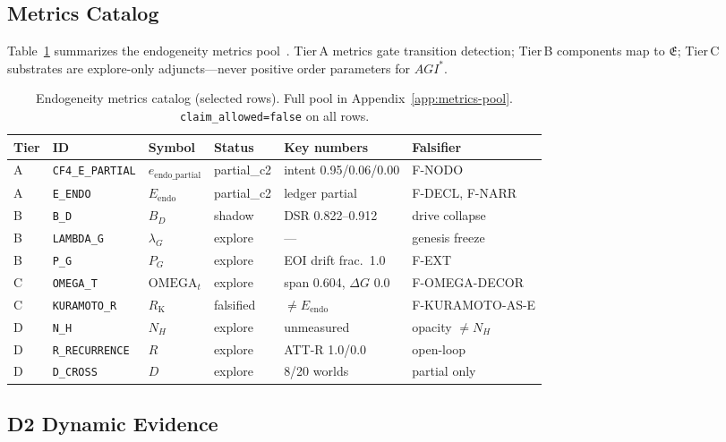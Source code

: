 \documentclass[11pt,a4paper]{article}
\theoremstyle{definition}
\begin{document}
\subsection{Metrics Catalog}\label{sec:metrics-catalog}

Table~\ref{tab:metrics-catalog} summarizes the endogeneity metrics pool~\cite{kuznetsov2026metrics}. Tier\,A metrics gate transition detection; Tier\,B components map to $\mathfrak{E}$; Tier\,C substrates are explore-only adjuncts---never positive order parameters for $AGI^{*}$.

\begin{table}[H]
\centering\scriptsize
\begin{tabular}{llllp{2.8cm}l}
\toprule Tier & ID & Symbol & Status & Key numbers & Falsifier \\ \midrule
A & \texttt{CF4\_E\_PARTIAL} & $e_{\mathrm{endo\_partial}}$ & partial\_c2 & intent 0.95/0.06/0.00 & F-NODO \\
A & \texttt{E\_ENDO} & $E_{\mathrm{endo}}$ & partial\_c2 & ledger partial & F-DECL, F-NARR \\
B & \texttt{B\_D} & $B_D$ & shadow & DSR 0.822--0.912 & drive collapse \\
B & \texttt{LAMBDA\_G} & $\lambda_G$ & explore & --- & genesis freeze \\
B & \texttt{P\_G} & $P_G$ & explore & EOI drift frac.\ 1.0 & F-EXT \\
C & \texttt{OMEGA\_T} & $\mathrm{OMEGA}_t$ & explore & span 0.604, $\Delta G$ 0.0 & F-OMEGA-DECOR \\
C & \texttt{KURAMOTO\_R} & $R_{\mathrm{K}}$ & falsified & $\neq E_{\mathrm{endo}}$ & F-KURAMOTO-AS-E \\
D & \texttt{N\_H} & $N_H$ & explore & unmeasured & opacity $\neq N_H$ \\
D & \texttt{R\_RECURRENCE} & $R$ & explore & ATT-R 1.0/0.0 & open-loop \\
D & \texttt{D\_CROSS} & $D$ & explore & 8/20 worlds & partial only \\ \bottomrule
\end{tabular}
\caption{Endogeneity metrics catalog (selected rows). Full pool in Appendix~\ref{app:metrics-pool}. \texttt{claim\_allowed=false} on all rows.}
\label{tab:metrics-catalog}
\end{table}

\subsection{D2 Dynamic Evidence}\label{sec:d2-evidence}
\end{document}
